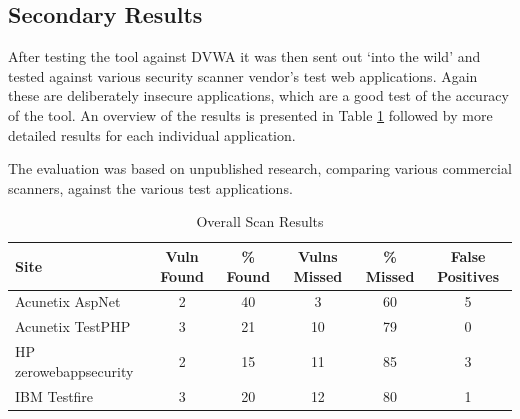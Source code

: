 \documentclass[12pt,a4paper]{article}
\begin{document}
\subsection{Secondary Results}
After testing the tool against DVWA it was then sent out `into the wild' and tested against various security scanner vendor's test web applications.  Again these are deliberately insecure applications, which are a good test of the accuracy of the tool.  An overview of the results is presented in Table \ref{tab:secondary_results} followed by more detailed results for each individual application.

The evaluation was based on unpublished research, comparing various commercial scanners, against the various test applications. \cite{Suto2010}

\begin{center}
    \begin{table}
        \caption{Overall Scan Results}
        \begin{center}
            \begin{tabular}{ | l | c | c | c | c | c | }
                \hline
                Site & Vuln Found & \% Found & Vulns Missed & \% Missed & False Positives  \\ \hline
                Acunetix AspNet & 2 & 40 & 3 & 60 & 5 \\ \hline
                Acunetix TestPHP & 3 & 21 & 10 & 79 & 0 \\ \hline
                HP zerowebappsecurity & 2 & 15 & 11 & 85 & 3 \\ \hline
                IBM Testfire & 3 & 20 & 12 & 80 & 1 \\ 
                \hline
            \end{tabular}
        \end{center}
        \label{tab:secondary_results}
    \end{table}
\end{center}
\end{document}
